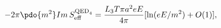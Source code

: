 \begin{equation}
\label{Eq_0615}
-2\pi \pdo{m^2} Im \, S^{\text{QED}_4}_{\text{eff}}
  = \frac{L_3 T \pi a^2 e E}{4 \pi}[\ln(eE/m^2) + O(1)],
\end{equation}

